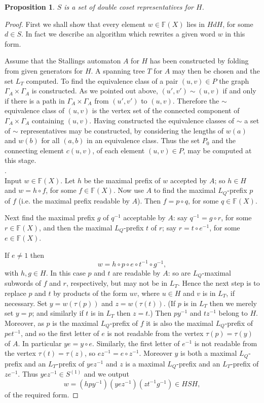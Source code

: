 \documentclass[a4paper,12pt]{article}
\newcommand{\G}{\Gamma }
\renewcommand{\t}{\tau }
\newtheorem{proposition}[theorem]{Proposition}
\numberwithin{equation}{section}
\numberwithin{figure}{section}
\newcommand{\FF}{\ensuremath{\mathbb{F}}}
\begin{document}
\begin{proposition}\label{prop:dcreps}
$S$ is a set of double coset representatives for $H$.
\end{proposition}
\begin{proof}
First we shall show that every element $w\in \FF(X)$ lies in $HdH$,
for some $d\in S$. In fact we describe an algorithm which
rewrites a given word $w$ in this form.

Assume that the Stallings automaton $A$ for $H$ has been constructed by folding from
given generators for $H$. A spanning tree $T$
for $A$ may then be chosen and the
set $L_T$ computed.
To find the equivalence class of a pair $(u,v)\in P$ the
graph $\G_A\times \G_A$ is constructed. As we pointed out above, $(u',v')\sim
(u,v)$ if and only if there is a path in $\G_A\times \G_A$ from $(u',v')$
to $(u,v)$. Therefore the $\sim$ equivalence class of $(u,v)$ is the
vertex set of the connected component of $\G_A\times \G_A$ containing
$(u,v)$.
Having constructed the equivalence classes of $\sim$
 a set of $\sim$ representatives may be constructed, by considering the
lengths of $w(a)$ and $w(b)$ for all $(a,b)$ in an equivalence class. Thus the
set $P_0$ and the connecting element $c(u,v)$, of each element
$(u,v)\in P$, may be computed at this stage.   \\

.\\
Input $w\in \FF(X)$.
Let $h$ be the maximal prefix of $w$ accepted by $A$; so $h\in H$ and
$w=h\circ f$, for some $f\in \FF(X)$. Now use $A$ to find the maximal
$L_Q$-prefix $p$
of $f$ (i.e. the maximal prefix readable by $A$). Then
  $f= p\circ q$, for some $q\in \FF(X)$.

Next find the maximal prefix $g$ of $q^{-1}$ acceptable by $A$: say
$q^{-1}=g\circ r$, for some $r\in \FF(X)$, and then the maximal $L_Q$-prefix
$t$ of $r$; say $r=t\circ e^{-1}$, for some $e\in \FF(X)$.

If $e\neq 1$ then
\[w=h\circ p \circ e\circ t^{-1}\circ g^{-1},\]
with $h,g\in H$. In this case $p$ and $t$ are readable by $A$: 
so are $L_Q$-maximal subwords of $f$ and $r$, respectively, but 
may not be in $L_T$. Hence the next step is to replace $p$ and $t$ by
products of the form $uv$, where $u\in H$ and  $v$ is in $L_T$,
 if necessary.   
Set $y=w(\t(p))$ and  $z=w(\t(t))$. (If $p$ is in $L_T$ then we
merely set $y=p$; and similarly if $t$ is in $L_T$ then $z=t$.)
Then $py^{-1}$ and $tz^{-1}$ belong to $H$. Moreover, as $p$
is the maximal $L_Q$-prefix of $f$ it is also the maximal
$L_Q$-prefix of $pet^{-1}$,  and so
  the
first letter of $e$ is not readable from the vertex $\t(p)=\t(y)$
of $A$. In
particular $ye=y\circ e$. Similarly, the first letter of $e^{-1}$
is not readable from the vertex $\t(t)=\t(z)$, so $ez^{-1}=e\circ
z^{-1}$. Moreover $y$ is both a maximal $L_Q$-prefix  and an
$L_T$-prefix of $yez^{-1}$ and $z$ is a maximal $L_Q$-prefix  and
an $L_T$-prefix of $ze^{-1}$. Thus $yez^{-1}\in S^{(1)}$ and we
output
\[w=(h py^{-1}) (yez^{-1})(zt^{-1} g^{-1})\in HSH,\]
of the required form.


\end{proof}
\end{document}
